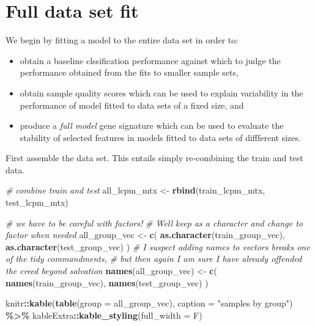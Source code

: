 \documentclass[
]{book}
\newenvironment{Shaded}{\begin{snugshade}}{\end{snugshade}}
\newcommand{\CommentTok}[1]{\textcolor[rgb]{0.56,0.35,0.01}{\textit{#1}}}
\newcommand{\DataTypeTok}[1]{\textcolor[rgb]{0.13,0.29,0.53}{#1}}
\newcommand{\KeywordTok}[1]{\textcolor[rgb]{0.13,0.29,0.53}{\textbf{#1}}}
\newcommand{\NormalTok}[1]{#1}
\newcommand{\OperatorTok}[1]{\textcolor[rgb]{0.81,0.36,0.00}{\textbf{#1}}}
\newcommand{\StringTok}[1]{\textcolor[rgb]{0.31,0.60,0.02}{#1}}
\begin{document}
\hypertarget{full-data-set-fit}{%
\section{Full data set fit}\label{full-data-set-fit}}

We begin by fitting a model to the entire data set in order to:

\begin{itemize}
\item
  obtain a baseline clssification performance against which to judge the performance
  obtained from the fits to smaller sample sets,
\item
  obtain sample quality scores which can be used to explain variability
  in the performance of model fitted to data sets of a fixed size, and
\item
  produce a \emph{full model} gene signature which can be used to evaluate
  the stability of selected features in models fitted to data sets of diffferent
  sizes.
\end{itemize}

First assemble the data set. This entails simply re-combining the
train and test data.

\begin{Shaded}
\begin{Highlighting}[]
\CommentTok{\# combine train and test }
\NormalTok{all\_lcpm\_mtx <{-}}\StringTok{ }\KeywordTok{rbind}\NormalTok{(train\_lcpm\_mtx, test\_lcpm\_mtx)}

\CommentTok{\# we have to be careful with factors!}
\CommentTok{\# We\textquotesingle{}ll keep as a character and change to factor when needed}
\NormalTok{all\_group\_vec <{-}}\StringTok{ }\KeywordTok{c}\NormalTok{(}
 \KeywordTok{as.character}\NormalTok{(train\_group\_vec), }
 \KeywordTok{as.character}\NormalTok{(test\_group\_vec)}
\NormalTok{)}
\CommentTok{\# I suspect adding names to vectors breaks one of the tidy commandments,}
\CommentTok{\# but then again I am sure I have already offended the creed beyond salvation}
\KeywordTok{names}\NormalTok{(all\_group\_vec) <{-}}\StringTok{ }\KeywordTok{c}\NormalTok{(}
 \KeywordTok{names}\NormalTok{(train\_group\_vec),}
 \KeywordTok{names}\NormalTok{(test\_group\_vec)}
\NormalTok{)}

\NormalTok{knitr}\OperatorTok{::}\KeywordTok{kable}\NormalTok{(}\KeywordTok{table}\NormalTok{(}\DataTypeTok{group =}\NormalTok{ all\_group\_vec),}
  \DataTypeTok{caption =} \StringTok{"samples by group"}\NormalTok{) }\OperatorTok{\%>\%}
\StringTok{   }\NormalTok{kableExtra}\OperatorTok{::}\KeywordTok{kable\_styling}\NormalTok{(}\DataTypeTok{full\_width =}\NormalTok{ F)}
\end{Highlighting}
\end{Shaded}
\end{document}
